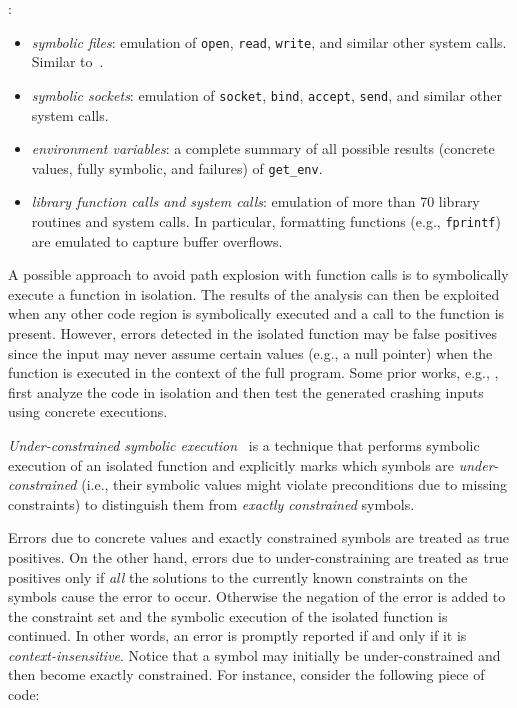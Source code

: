 \cite{AEG-NDSS11}:
\begin{itemize}
  \item {\em symbolic files}: emulation of {\tt open}, {\tt read}, {\tt write}, and similar other system calls. Similar to~\cite{KLEE-OSDI08}.
  \item {\em symbolic sockets}: emulation of {\tt socket}, {\tt bind}, {\tt accept}, {\tt send}, and similar other system calls. 
  \item {\em environment variables}: a complete summary of all possible results (concrete values, fully symbolic, and failures) of {\tt get\_env}.
  \item {\em library function calls and system calls}: emulation of more than 70 library routines and system calls. In particular, formatting functions (e.g., {\tt fprintf}) are emulated to capture buffer overflows.
\end{itemize}
\fi



\iffalse %
A possible approach to avoid path explosion with function calls is to symbolically execute a function in isolation. The results of the analysis can then be exploited when any other code region is symbolically executed and a call to the function is present. However, errors detected in the isolated function may be false positives since the input may never assume certain values (e.g., a null pointer) when the function is executed in the context of the full program. Some prior works, e.g., \cite{CS-ICSE05}, first analyze the code in isolation and then test the generated crashing inputs using concrete executions. %

{\em Under-constrained symbolic execution}~\cite{ED-ISSTA07} is a technique that performs symbolic execution of an isolated function and explicitly marks which symbols are {\em under-constrained} (i.e., their symbolic values might violate preconditions due to missing constraints) to distinguish them from {\em exactly constrained} symbols.

Errors due to concrete values and exactly constrained symbols are treated as true positives. On the other hand, errors due to under-constraining are treated as true positives only if {\em all} the solutions to the currently known constraints on the symbols cause the error to occur. Otherwise the negation of the error is added to the constraint set and the symbolic execution of the isolated function is continued. In other words, an error is  promptly reported if and only if it is {\em context-insensitive}. Notice that a symbol may initially be under-constrained and then become exactly constrained. For instance, consider the following piece of code:

